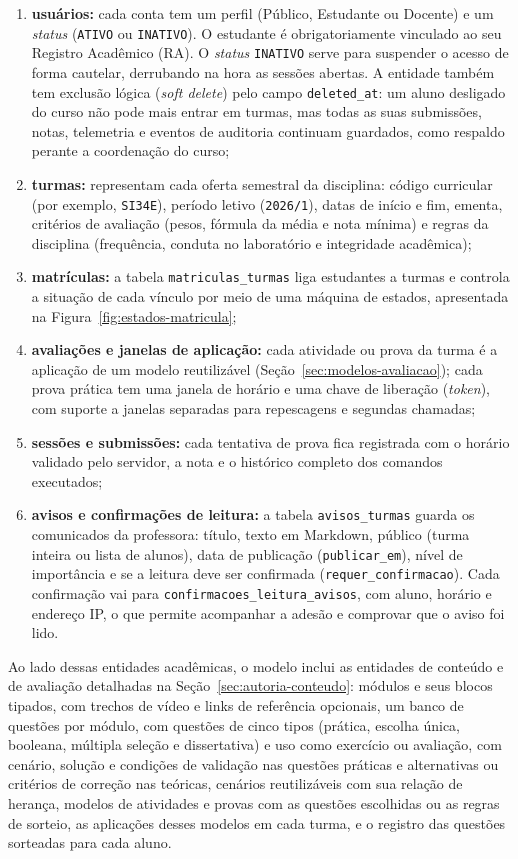 \begin{enumerate}
    \item \textbf{usuários:} cada conta tem um perfil (Público, Estudante ou Docente) e um \textit{status} (\texttt{ATIVO} ou \texttt{INATIVO}). O estudante é obrigatoriamente vinculado ao seu Registro Acadêmico (RA). O \textit{status} \texttt{INATIVO} serve para suspender o acesso de forma cautelar, derrubando na hora as sessões abertas. A entidade também tem exclusão lógica (\textit{soft delete}) pelo campo \texttt{deleted\_at}: um aluno desligado do curso não pode mais entrar em turmas, mas todas as suas submissões, notas, telemetria e eventos de auditoria continuam guardados, como respaldo perante a coordenação do curso;
    \item \textbf{turmas:} representam cada oferta semestral da disciplina: código curricular (por exemplo, \texttt{SI34E}), período letivo (\texttt{2026/1}), datas de início e fim, ementa, critérios de avaliação (pesos, fórmula da média e nota mínima) e regras da disciplina (frequência, conduta no laboratório e integridade acadêmica);
    \item \textbf{matrículas:} a tabela \texttt{matriculas\_turmas} liga estudantes a turmas e controla a situação de cada vínculo por meio de uma máquina de estados, apresentada na Figura~\ref{fig:estados-matricula};
    \item \textbf{avaliações e janelas de aplicação:} cada atividade ou prova da turma é a aplicação de um modelo reutilizável (Seção~\ref{sec:modelos-avaliacao}); cada prova prática tem uma janela de horário e uma chave de liberação (\textit{token}), com suporte a janelas separadas para repescagens e segundas chamadas;
    \item \textbf{sessões e submissões:} cada tentativa de prova fica registrada com o horário validado pelo servidor, a nota e o histórico completo dos comandos executados;
    \item \textbf{avisos e confirmações de leitura:} a tabela \texttt{avisos\_turmas} guarda os comunicados da professora: título, texto em Markdown, público (turma inteira ou lista de alunos), data de publicação (\texttt{publicar\_em}), nível de importância e se a leitura deve ser confirmada (\texttt{requer\_confirmacao}). Cada confirmação vai para \texttt{confirmacoes\_leitura\_avisos}, com aluno, horário e endereço IP, o que permite acompanhar a adesão e comprovar que o aviso foi lido.
\end{enumerate}

Ao lado dessas entidades acadêmicas, o modelo inclui as entidades de conteúdo e de avaliação detalhadas na Seção~\ref{sec:autoria-conteudo}: módulos e seus blocos tipados, com trechos de vídeo e links de referência opcionais, um banco de questões por módulo, com questões de cinco tipos (prática, escolha única, booleana, múltipla seleção e dissertativa) e uso como exercício ou avaliação, com cenário, solução e condições de validação nas questões práticas e alternativas ou critérios de correção nas teóricas, cenários reutilizáveis com sua relação de herança, modelos de atividades e provas com as questões escolhidas ou as regras de sorteio, as aplicações desses modelos em cada turma, e o registro das questões sorteadas para cada aluno.

